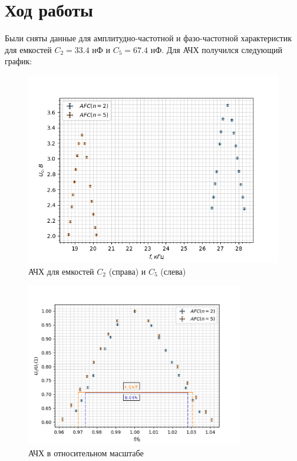 \documentclass[a4paper, 12pt]{article}
\begin{document}
\newpage

\section*{Ход работы}

Были сняты данные для амплитудно-частотной и фазо-частотной характеристик для емкостей $C_2 = 33.4$ нФ и $C_5 = 67.4$ нФ. Для АЧХ получился следующий график:

\begin{figure}[h]
    \includegraphics[width = \textwidth]{AFC/graphs/combined_graph.png}
    \caption{АЧХ для емкостей $C_2$ (справа) и $C_5$ (слева)}
\end{figure}

\begin{figure}[H]
	\centering
	\includegraphics[width = 0.85\textwidth, height = 0.44\textheight]{AFC_dimensionless/graphs/combined_marked.pdf}
	\caption{АЧХ в относительном масштабе}
\end{figure}
\end{document}
